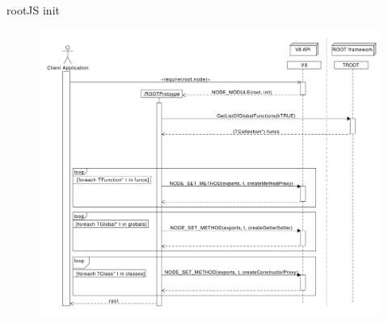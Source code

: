 \begin{frame}{rootJS init}
  \begin{figure}[htb]
    \centering
      \includegraphics[width=\textwidth, height=.85\textheight, keepaspectratio]{./resources/initialize/initialize_h0.pdf}
  \end{figure}
\end{frame}
